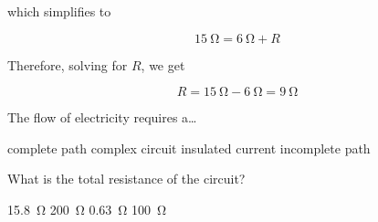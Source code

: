 \documentclass[]{exam}
\begin{document}
\begin{questions}
\begin{solution}
which simplifies to

\begin{equation*}
    \SI{15}{\ohm} = \SI{6}{\ohm} + R
\end{equation*}

Therefore, solving for $R$, we get

\begin{equation*}
    R = \SI{15}{\ohm} - \SI{6}{\ohm} = \boxed{\SI{9}{\ohm}}
\end{equation*}
\end{solution}

\ifprintanswers \else \clearpage \fi






\question
The flow of electricity requires a\ldots 

\begin{randomizechoices}
    \correctchoice complete path
    \choice complex circuit
    \choice insulated current
    \choice incomplete path
\end{randomizechoices}


\question
What is the total resistance of the circuit?

\begin{center}
\end{center}

\begin{randomizechoices}
    \choice \SI{15.8}{\ohm}
    \correctchoice \SI{200}{\ohm}
    \choice \SI{0.63}{\ohm}
    \choice \SI{100}{\ohm}
\end{randomizechoices}


\end{questions}
\end{document}
